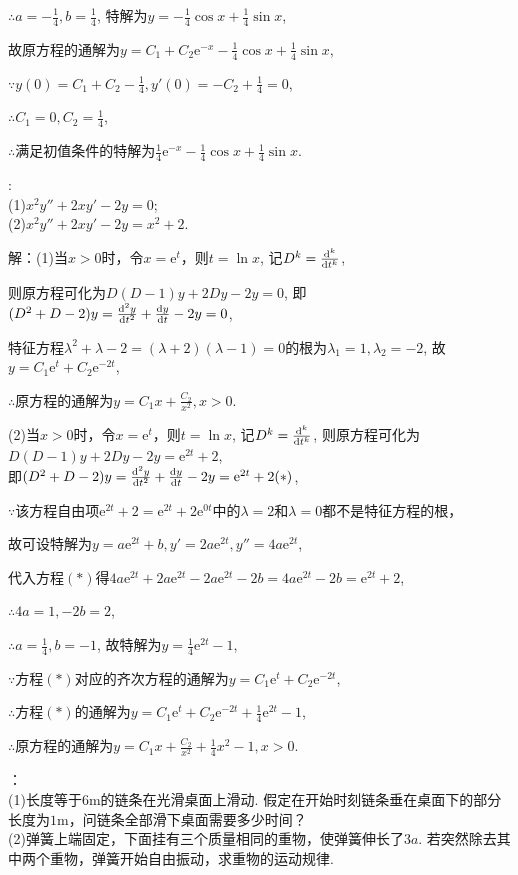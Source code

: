 \documentclass[12pt,UTF8]{ctexart}
\newcommand{\md}[1]{\mathrm d#1}
\newcommand{\me}[0]{\mathrm e}
\begin{document}
\begin{enumerate}
$\therefore a=-\frac14,b=\frac14$, 特解为$y=-\frac14\cos x+\frac14\sin x$,

故原方程的通解为$y=C_1+C_2\me^{-x}-\frac14\cos x+\frac14\sin x$,

$\because y(0)=C_1+C_2-\frac14,y'(0)=-C_2+\frac14=0$,

$\therefore C_1=0,C_2=\frac14$,

$\therefore$满足初值条件的特解为$\frac14\me^{-x}-\frac14\cos x+\frac14\sin x$.

:\\
(1)$x^2y''+2xy'-2y=0$;\\
(2)$x^2y''+2xy'-2y=x^2+2$.

解：(1)当$x>0$时，令$x=\me^t$，则$t=\ln x$, 记$D^k=\frac{\md^k}{\md t^k}$,

则原方程可化为$D(D-1)y+2Dy-2y=0$, 即$(D^2+D-2)y=\frac{\md^2y}{\md t^2}+\frac{\md y}{\md t}-2y=0$,

特征方程$\lambda^2+\lambda-2=(\lambda+2)(\lambda-1)=0$的根为$\lambda_1=1,\lambda_2=-2$, 故$y=C_1\me^t+C_2\me^{-2t}$,

$\therefore$原方程的通解为$y=C_1x+\frac{C_2}{x^2},x>0$.

(2)当$x>0$时，令$x=\me^t$，则$t=\ln x$, 记$D^k=\frac{\md^k}{\md t^k}$, 则原方程可化为$D(D-1)y+2Dy-2y=\me^{2t}+2$,\\
即$(D^2+D-2)y=\frac{\md^2y}{\md t^2}+\frac{\md y}{\md t}-2y=\me^{2t}+2(*)$,

$\because$该方程自由项$\me^{2t}+2=\me^{2t}+2\me^{0t}$中的$\lambda=2$和$\lambda=0$都不是特征方程的根，

故可设特解为$y=a\me^{2t}+b,y'=2a\me^{2t},y''=4a\me^{2t}$,

代入方程$(*)$得$4a\me^{2t}+2a\me^{2t}-2a\me^{2t}-2b=4a\me^{2t}-2b=\me^{2t}+2$,

$\therefore 4a=1,-2b=2$,

$\therefore a=\frac14,b=-1$, 故特解为$y=\frac14\me^{2t}-1$,

$\because$方程$(*)$对应的齐次方程的通解为$y=C_1\me^t+C_2\me^{-2t}$,

$\therefore$方程$(*)$的通解为$y=C_1\me^t+C_2\me^{-2t}+\frac14\me^{2t}-1$,

$\therefore$原方程的通解为$y=C_1x+\frac{C_2}{x^2}+\frac14x^2-1,x>0$.

：\\
(1)长度等于$6\text{m}$的链条在光滑桌面上滑动. 假定在开始时刻链条垂在桌面下的部分长度为$1\text{m}$，问链条全部滑下桌面需要多少时间？\\
(2)弹簧上端固定，下面挂有三个质量相同的重物，使弹簧伸长了$3a$. 若突然除去其中两个重物，弹簧开始自由振动，求重物的运动规律.


\end{enumerate}
\end{document}
